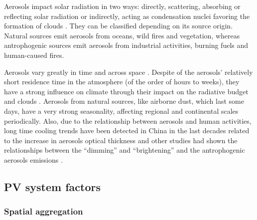 Aerosols impact solar radiation in two ways: directly, scattering, absorbing or reflecting solar radiation or indirectly, acting as condensation nuclei favoring the formation of clouds \cite*{boucher2015}. They can be classified depending on its source origin. Natural sources emit aerosols from oceans, wild fires and vegetation, whereas antrophogenic sources emit aerosols from industrial activities, burning fuels and human-caused fires.


Aerosols vary greatly in time and across space \cite*{Kaufman2002}. Despite of the aerosols' relatively short residence time in the atmosphere (of the order of hours to weeks), they have a strong influence on climate through their impact on the radiative budget and clouds \cite*{Nabat2014, Nabat2015}. Aerosols from natural sources, like airborne dust, which last some days, have a very strong seasonality, affecting regional and continental scales periodically.  Also, due to the relationship between aerosols and human activities, long time cooling trends have been detected in China in the last decades related to the increase in aerosols optical thickness \cite*{Giorgi2002} and other studies had shown the relationships between the ``dimming'' and ``brightening'' and the antrophogenic aerosols emissions \cite*{Wild2005, Wild2012, Wild2009}. 


\subsection{PV system factors}

\subsubsection{Spatial aggregation}

